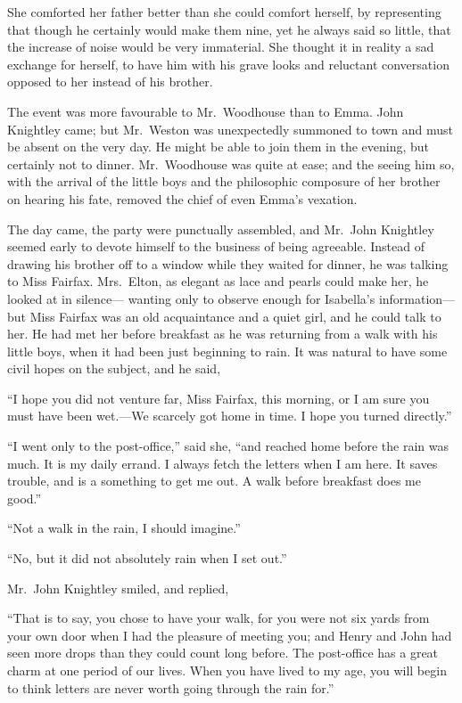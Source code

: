 She comforted her father better than she could comfort herself,
by representing that though he certainly would make them nine,
yet he always said so little, that the increase of noise would be
very immaterial.  She thought it in reality a sad exchange for herself,
to have him with his grave looks and reluctant conversation opposed
to her instead of his brother.

The event was more favourable to Mr.\ Woodhouse than to Emma.
John Knightley came; but Mr.\ Weston was unexpectedly summoned to town
and must be absent on the very day.  He might be able to join them
in the evening, but certainly not to dinner.  Mr.\ Woodhouse was quite
at ease; and the seeing him so, with the arrival of the little boys
and the philosophic composure of her brother on hearing his fate,
removed the chief of even Emma's vexation.

The day came, the party were punctually assembled, and Mr.\ John Knightley
seemed early to devote himself to the business of being agreeable.
Instead of drawing his brother off to a window while they waited
for dinner, he was talking to Miss Fairfax.  Mrs.\ Elton, as elegant
as lace and pearls could make her, he looked at in silence---%
wanting only to observe enough for Isabella's information---but Miss
Fairfax was an old acquaintance and a quiet girl, and he could
talk to her.  He had met her before breakfast as he was returning
from a walk with his little boys, when it had been just beginning
to rain.  It was natural to have some civil hopes on the subject,
and he said,

``I hope you did not venture far, Miss Fairfax, this morning, or I
am sure you must have been wet.---We scarcely got home in time.
I hope you turned directly.''

``I went only to the post-office,'' said she, ``and reached home
before the rain was much.  It is my daily errand.  I always fetch
the letters when I am here.  It saves trouble, and is a something
to get me out.  A walk before breakfast does me good.''

``Not a walk in the rain, I should imagine.''

``No, but it did not absolutely rain when I set out.''

Mr.\ John Knightley smiled, and replied,

``That is to say, you chose to have your walk, for you were not six
yards from your own door when I had the pleasure of meeting you;
and Henry and John had seen more drops than they could count long before.
The post-office has a great charm at one period of our lives.
When you have lived to my age, you will begin to think letters are
never worth going through the rain for.''


